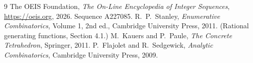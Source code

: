 \documentclass[11pt,a4paper]{article}
\theoremstyle{plain}
\theoremstyle{definition}
\begin{document}
\begin{thebibliography}{9}
 The OEIS Foundation, \emph{The On-Line Encyclopedia of Integer
Sequences}, \url{https://oeis.org}, 2026. Sequence A227085.
 R.~P.~Stanley, \emph{Enumerative Combinatorics}, Volume 1, 2nd ed.,
Cambridge University Press, 2011. (Rational generating functions, Section 4.1.)
 M.~Kauers and P.~Paule, \emph{The Concrete Tetrahedron}, Springer, 2011.
 P.~Flajolet and R.~Sedgewick, \emph{Analytic Combinatorics}, Cambridge
University Press, 2009.
\end{thebibliography}
\end{document}
